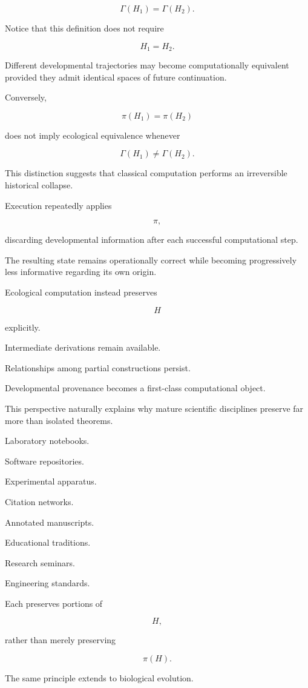 \documentclass[12pt,oneside]{article}
\theoremstyle{remark}
\begin{document}
\[
\Gamma(H_1)
=
\Gamma(H_2).
\]

Notice that this definition does not require

\[
H_1
=
H_2.
\]

Different developmental trajectories may become computationally equivalent
provided they admit identical spaces of future continuation.

Conversely,

\[
\pi(H_1)
=
\pi(H_2)
\]

does not imply ecological equivalence whenever

\[
\Gamma(H_1)
\neq
\Gamma(H_2).
\]

This distinction suggests that classical computation performs an irreversible
historical collapse.

Execution repeatedly applies

\[
\pi,
\]

discarding developmental information after each successful computational step.

The resulting state remains operationally correct while becoming progressively
less informative regarding its own origin.

Ecological computation instead preserves

\[
H
\]

explicitly.

Intermediate derivations remain available.

Relationships among partial constructions persist.

Developmental provenance becomes a first-class computational object.

This perspective naturally explains why mature scientific disciplines preserve
far more than isolated theorems.

Laboratory notebooks.

Software repositories.

Experimental apparatus.

Citation networks.

Annotated manuscripts.

Educational traditions.

Research seminars.

Engineering standards.

Each preserves portions of

\[
H,
\]

rather than merely preserving

\[
\pi(H).
\]

The same principle extends to biological evolution.
\end{document}
